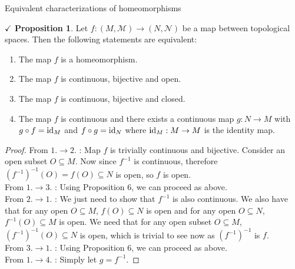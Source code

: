 \documentclass{article}
\newcommand*{\myfont}{\fontfamily{cmr}\selectfont}
\newcommand{\id}[1]{{\myfont \text{id}_{#1}}}
\theoremstyle{definition}
\theoremstyle{remark}
\theoremstyle{definition}
\theoremstyle{definition}
\newtheorem{proposition}{$\checkmark$ Proposition}
\newcommand{\topo}[1]{\mathcal{#1}}
\begin{document}
\hrulefill
Equivalent characterizations of homeomorphisms
\hrulefill
\begin{proposition}
	Let $ f : (M,\topo{M}) \longrightarrow (N,\topo{N}) $ be a map between topological spaces. Then the following statements are equivalent:
	\begin{enumerate}
		\item{The map $ f $ is a homeomorphism.}
		\item{The map $ f $ is continuous, bijective and open.}
		\item{The map $ f $ is continuous, bijective and closed.}
		\item{The map $ f $ is continuous and there exists a continuous map $ g : N\longrightarrow M $ with $ g\circ f = \id{M}$ and $ f\circ g = \id{N} $ where $ \id{M} : M \to M $ is the identity map. }
	\end{enumerate}
\end{proposition}
\begin{proof}
	From $1. \to 2. $ : Map $ f $ is trivially continuous and bijective. Consider an open subset $ O \subseteq M $. Now since $ f^{-1} $ is continuous, therefore $ (f^{-1})^{-1}(O) = f(O) \subseteq N $ is open, so $ f  $ is open.\\
	From $ 1. \to 3. $ : Using Proposition 6, we can proceed as above.\\
	From $ 2. \to 1. $ : We just need to show that $ f^{-1} $ is also continuous. We also have that for any open $ O \subseteq M $, $ f(O) \subseteq N$ is open and for any open $ O \subseteq N $, $ f^{-1}(O) \subseteq M $ is open. We need that for any open subset $ O \subseteq M $, $ (f^{-1})^{-1}(O)  \subseteq N$ is open, which is trivial to see now as $ (f^{-1})^{-1} $ is $ f $.\\
	From $ 3. \to 1. $ : Using Proposition 6, we can proceed as above.\\
	From $ 1. \to 4. $ : Simply let $ g = f^{-1} $.
\end{proof}
\hrulefill
\end{document}
